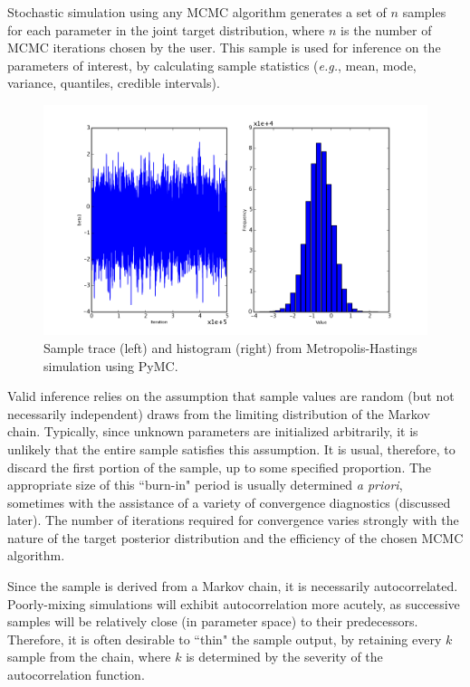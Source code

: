 \documentclass[]{book}
\begin{document}
Stochastic simulation using any MCMC algorithm generates a set of $n$ samples for each parameter in the joint target distribution, where $n$ is the number of MCMC iterations chosen by the user. This sample is used for inference on the parameters of interest, by calculating sample statistics (\emph{e.g.}, mean, mode, variance, quantiles, credible intervals).

\begin{figure}[ht]
        \begin{center}
        \includegraphics[scale=0.4]{sample_output.png}
    \end{center}
    \caption{Sample trace (left) and histogram (right) from Metropolis-Hastings simulation using PyMC.}
    \label{fig:sample_output}
\end{figure}

Valid inference relies on the assumption that sample values are random (but not necessarily independent) draws from the limiting distribution of the Markov chain. Typically, since unknown parameters are initialized arbitrarily, it is unlikely that the entire sample satisfies this assumption. It is usual, therefore, to discard the first portion of the sample, up to some specified proportion. The appropriate size of this ``burn-in" period is usually determined  \emph{a priori}, sometimes with the assistance of a variety of convergence diagnostics (discussed later). The number of iterations required for convergence varies strongly with the nature of the target posterior distribution and the efficiency of the chosen MCMC algorithm.

Since the sample is derived from a Markov chain, it is necessarily autocorrelated. Poorly-mixing simulations will exhibit autocorrelation more acutely, as successive samples will be relatively close (in parameter space) to their predecessors. Therefore, it is often desirable to ``thin" the sample output, by retaining every $k$ sample from the chain, where $k$ is determined by the severity of the autocorrelation function.
\end{document}
